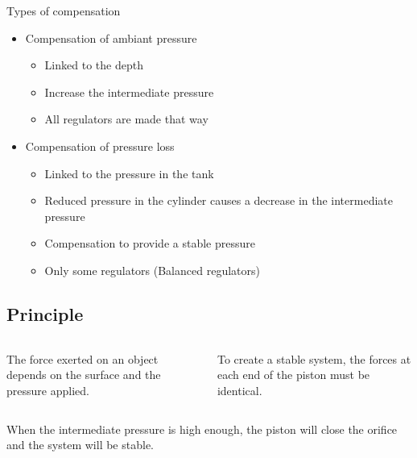 \documentclass[aspectratio=1610,english,12pt]{beamer}
\begin{document}
\begin{frame}{Types of compensation}
	\begin{itemize}
		\item Compensation of ambiant pressure
		\begin{itemize}
			\item Linked to the depth
			\item Increase the intermediate pressure
			\item All regulators are made that way
		\end{itemize}
		\item Compensation of pressure loss
		\begin{itemize}
			\item Linked to the pressure in the tank
			\item Reduced pressure in the cylinder causes a decrease in the intermediate pressure 
			\item Compensation to provide a stable pressure
			\item Only some regulators (Balanced regulators)
		\end{itemize}		
	\end{itemize}
\end{frame}

\subsection{Principle}

\begin{frame}{\insertsubsection}
	\begin{columns}[onlytextwidth]
			The force exerted on an object depends on the surface and the pressure applied.\par
			To create a stable system, the forces at each end of the piston must be identical.
	\end{columns}
\end{frame}

\begin{frame}{\insertsubsection}
	\begin{columns}[onlytextwidth]
			When the intermediate pressure is high enough, the piston will close the orifice and the system will be stable.
	\end{columns}
\end{frame}
\end{document}
